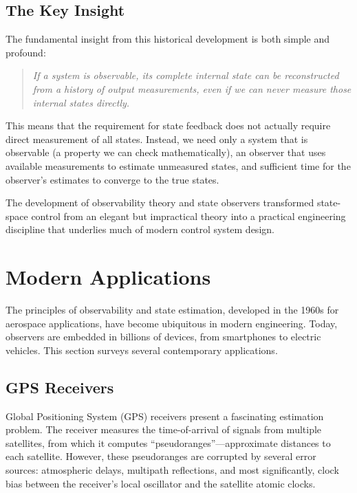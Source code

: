 \subsection{The Key Insight}

The fundamental insight from this historical development is both simple and profound:

\begin{quote}
\textit{If a system is observable, its complete internal state can be reconstructed from a history of output measurements, even if we can never measure those internal states directly.}
\end{quote}

This means that the requirement for state feedback does not actually require direct measurement of all states. Instead, we need only a system that is observable (a property we can check mathematically), an observer that uses available measurements to estimate unmeasured states, and sufficient time for the observer's estimates to converge to the true states.

The development of observability theory and state observers transformed state-space control from an elegant but impractical theory into a practical engineering discipline that underlies much of modern control system design.

\section{Modern Applications}

The principles of observability and state estimation, developed in the 1960s for aerospace applications, have become ubiquitous in modern engineering. Today, observers are embedded in billions of devices, from smartphones to electric vehicles. This section surveys several contemporary applications.

\subsection{GPS Receivers}

Global Positioning System (GPS) receivers present a fascinating estimation problem. The receiver measures the time-of-arrival of signals from multiple satellites, from which it computes ``pseudoranges''---approximate distances to each satellite. However, these pseudoranges are corrupted by several error sources: atmospheric delays, multipath reflections, and most significantly, clock bias between the receiver's local oscillator and the satellite atomic clocks.

